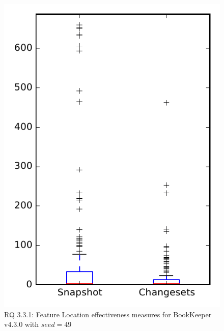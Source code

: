 
\begin{figure}
\centering
\includegraphics[height=0.4\textheight]{figures/flt_seed/rq1_bookkeeper_49}
\caption{RQ 3.3.1: Feature Location effectiveness measures for BookKeeper v4.3.0 with $seed=49$}
\label{fig:flt_seed:rq1:bookkeeper}
\end{figure}
